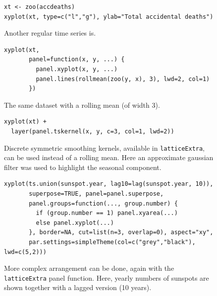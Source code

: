 \documentclass[a4paper,twoside]{book}
\newcounter{fig}
\newcommand{\img}[1]{\texttt{[image: \#1]}\stepcounter{fig}}
\renewcommand{\texttt}[1]{\lstinline{#1}}
\begin{document}
\begin{figure}[H]
\begin{lstlisting}
xt <- zoo(accdeaths)
xyplot(xt, type=c("l","g"), ylab="Total accidental deaths")
\end{lstlisting}
  \fcapside[\FBwidth] {\img{figs_lattice-crop}}
  {\caption*{
      Another regular time series is.}}
\end{figure}

\begin{figure}[H]
\begin{lstlisting}
xyplot(xt,
       panel=function(x, y, ...) {
         panel.xyplot(x, y, ...)
         panel.lines(rollmean(zoo(y, x), 3), lwd=2, col=1)
       })
\end{lstlisting}
  \fcapside[\FBwidth] {\img{figs_lattice-crop}}
  {\caption*{The same dataset with a rolling mean (of width 3).}}
\end{figure}

\begin{figure}[H]
\begin{lstlisting}
xyplot(xt) +
  layer(panel.tskernel(x, y, c=3, col=1, lwd=2))
\end{lstlisting}
  \fcapside[\FBwidth] {\img{figs_lattice-crop}}
  {\caption*{Discrete symmetric smoothing kernels, available in
      \texttt{latticeExtra}, can be used instead of a rolling
      mean. Here an approximate gaussian filter was used to highlight
      the seasonal component.}}
\end{figure}

\begin{figure}[H]
\begin{lstlisting}
xyplot(ts.union(sunspot.year, lag10=lag(sunspot.year, 10)), 
       superpose=TRUE, panel=panel.superpose,
       panel.groups=function(..., group.number) {
         if (group.number == 1) panel.xyarea(...)
         else panel.xyplot(...)
       }, border=NA, cut=list(n=3, overlap=0), aspect="xy",
       par.settings=simpleTheme(col=c("grey","black"), lwd=c(5,2)))
\end{lstlisting}
  \fcapside[\FBwidth] {\img{figs_lattice-crop}}
  {\caption*{ More complex arrangement can be done,
      again with the \texttt{latticeExtra} panel function. Here,
      yearly numbers of sunspots are shown together with a lagged
      version (10 years).}}
\end{figure}
\end{document}
